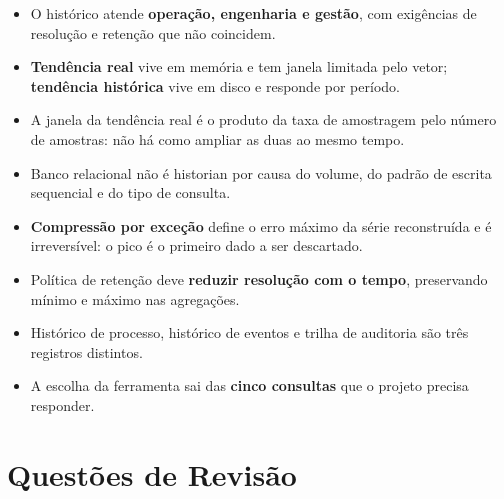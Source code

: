 \begin{itemize}
\tightlist
\item
  O histórico atende \textbf{operação, engenharia e gestão}, com exigências de resolução e retenção que não coincidem.
\item
  \textbf{Tendência real} vive em memória e tem janela limitada pelo vetor; \textbf{tendência histórica} vive em disco e responde por período.
\item
  A janela da tendência real é o produto da taxa de amostragem pelo número de amostras: não há como ampliar as duas ao mesmo tempo.
\item
  Banco relacional não é historian por causa do volume, do padrão de escrita sequencial e do tipo de consulta.
\item
  \textbf{Compressão por exceção} define o erro máximo da série reconstruída e é irreversível: o pico é o primeiro dado a ser descartado.
\item
  Política de retenção deve \textbf{reduzir resolução com o tempo}, preservando mínimo e máximo nas agregações.
\item
  Histórico de processo, histórico de eventos e trilha de auditoria são três registros distintos.
\item
  A escolha da ferramenta sai das \textbf{cinco consultas} que o projeto precisa responder.
\end{itemize}

\section{Questões de Revisão}\label{questuxf5es-de-revisuxe3o}

